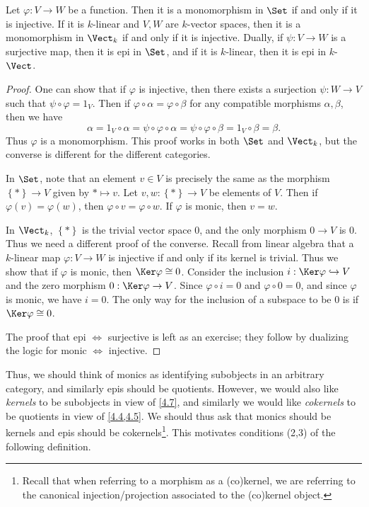 \begin{proposition}\label{4.12}
	Let $\varphi : V \to W$ be a function. Then it is a monomorphism in $\Set $ if and only if it is injective. If it is $k$-linear and $V,W$ are $k$-vector spaces, then it is a monomorphism in $\Vect_k$ if and only if it is injective. Dually, if $\psi : V \to W$ is a surjective map, then it is epi in $\Set $, and if it is $k$-linear, then it is epi in $k$-$\Vect$.
\end{proposition}
\begin{proof}
	One can show that if $\varphi $ is injective, then there exists a surjection $\psi : W \to V $ such that $\psi \circ \varphi =1_V$. Then if $\varphi \circ \alpha =\varphi \circ \beta $ for any compatible morphisms $\alpha ,\beta $, then we have
	\[
		\alpha =1_V\circ \alpha =\psi \circ \varphi \circ \alpha =\psi \circ \varphi \circ \beta =1_V \circ \beta =\beta 
	.\]
	Thus $\varphi $ is a monomorphism. This proof works in both $\Set $ and $\Vect_{k} $, but the converse is different for the different categories.

	In $\Set $, note that an element $v\in V$ is precisely the same as the morphism $\left\{ * \right\} \to V$ given by $*\mapsto v$. Let $v,w : \left\{ * \right\}  \to V$ be elements of $V$. Then if $\varphi (v)=\varphi (w)$, then $\varphi \circ v=\varphi \circ w$. If $\varphi $ is monic, then $v=w$.

	In $\Vect_{k} $, $\left\{ * \right\} $ is the trivial vector space $0$, and the only morphism $0\to V$ is 0. Thus we need a different proof of the converse. Recall from linear algebra that a $k$-linear map $\varphi : V \to W$ is injective if and only if its kernel is trivial. Thus we show that if $\varphi $ is monic, then $\Ker \varphi \cong0$. Consider the inclusion $i : \Ker \varphi \hookrightarrow V$ and the zero morphism $0 : \Ker \varphi  \to V$. Since $\varphi \circ i=0$ and $\varphi \circ 0=0$, and since $\varphi $ is monic, we have $i=0$. The only way for the inclusion of a subspace to be 0 is if $\Ker \varphi \cong 0$.

	The proof that epi $\iff $ surjective is left as an exercise; they follow by dualizing the logic for monic $\iff $ injective.
\end{proof}

Thus, we should think of monics as identifying subobjects in an arbitrary category, and similarly epis should be quotients. However, we would also like \emph{kernels} to be subobjects in view of \cref{4.7}, and similarly we would like \emph{cokernels} to be quotients in view of \cref{4.4,4.5}. We should thus ask that monics should be kernels and epis should be cokernels\footnote{Recall that when referring to a morphism as a (co)kernel, we are referring to the canonical injection/projection associated to the (co)kernel object.}. This motivates conditions (2,3) of the following definition.

